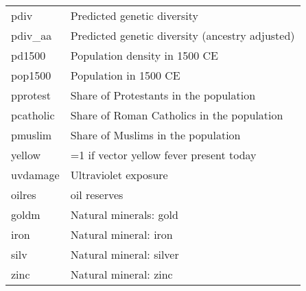 \begin{tabular}{ll}
pdiv            &                                               Predicted genetic diversity \\
pdiv\_aa         &                           Predicted genetic diversity (ancestry adjusted) \\
pd1500          &                                             Population density in 1500 CE \\
pop1500         &                                                     Population in 1500 CE \\
pprotest        &                                    Share of Protestants in the population \\
pcatholic       &                                Share of Roman Catholics in the population \\
pmuslim         &                                        Share of Muslims in the population \\
yellow          &                                   =1 if vector yellow fever present today \\
uvdamage        &                                                      Ultraviolet exposure \\
oilres          &                                                             oil reserves  \\
goldm           &                                                    Natural minerals: gold \\
iron            &                                                     Natural mineral: iron \\
silv            &                                                   Natural mineral: silver \\
zinc            &                                                     Natural mineral: zinc \\
\bottomrule
\end{tabular}
